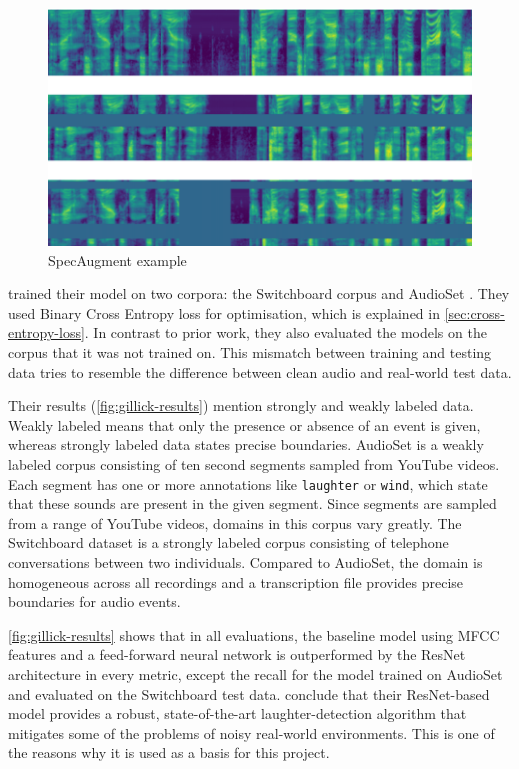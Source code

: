 \documentclass[bsc,frontabs,parskip,deptreport]{infthesis}
\begin{document}
\begin{figure}[h!]
    \centering
    \includegraphics[width=13cm]{imgs/examples/spec_augment_example.png}
    \caption{SpecAugment example}
    \label{fig:spec-augment}
\end{figure}

\citet{gillick2021robust} trained their model on two corpora: the Switchboard corpus \citep{switchboard-corpus} and AudioSet \citep{googleaudioset}. They used Binary Cross Entropy loss for optimisation, which is explained in \autoref{sec:cross-entropy-loss}.
In contrast to prior work, they also evaluated the models on the corpus that it was not trained on.
This mismatch between training and testing data tries to resemble the difference between clean audio and real-world test data.

Their results (\autoref{fig:gillick-results}) mention strongly and weakly labeled data.
Weakly labeled means that only the presence or absence of an event is given, whereas strongly labeled data states precise boundaries.
AudioSet \citep{googleaudioset} is a weakly labeled corpus consisting of ten second segments sampled from YouTube videos. Each segment has one or more annotations like \texttt{laughter} or \texttt{wind}, which state that these sounds are present in the given segment. Since segments are sampled from a range of YouTube videos, domains in this corpus vary greatly.
The Switchboard dataset is a strongly labeled corpus consisting of telephone conversations between two individuals. Compared to AudioSet, the domain is homogeneous across all recordings and a transcription file provides precise boundaries for audio events.

\autoref{fig:gillick-results} shows that in all evaluations, the baseline model using MFCC features and a feed-forward neural network is outperformed by the ResNet architecture in every metric, except the recall for the model trained on AudioSet and evaluated on the Switchboard test data. 
\citet{gillick2021robust} conclude that their ResNet-based model provides a robust, state-of-the-art laughter-detection algorithm that mitigates some of the problems of noisy real-world environments. This is one of the reasons why it is used as a basis for this project.
\end{document}
